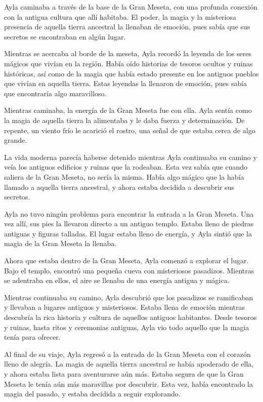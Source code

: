 
Ayla caminaba a través de la base de la Gran Meseta, con una profunda conexión con la antigua cultura que allí habitaba. El poder, la magia y la misteriosa presencia de aquella tierra ancestral la llenaban de emoción, pues sabía que sus secretos se encontraban en algún lugar.

Mientras se acercaba al borde de la meseta, Ayla recordó la leyenda de los seres mágicos que vivían en la región. Había oído historias de tesoros ocultos y ruinas históricas, así como de la magia que había estado presente en los antiguos pueblos que vivían en aquella tierra. Estas leyendas la llenaron de emoción, pues sabía que encontraría algo maravilloso.

Mientras caminaba, la energía de la Gran Meseta fue con ella. Ayla sentía como la magia de aquella tierra la alimentaba y le daba fuerza y determinación. De repente, un viento frío le acarició el rostro, una señal de que estaba cerca de algo grande.

La vida moderna parecía haberse detenido mientras Ayla continuaba su camino y veía los antiguos edificios y ruinas que la rodeaban. Esta vez sabía que cuando saliera de la Gran Meseta, no sería la misma. Había algo mágico que la había llamado a aquella tierra ancestral, y ahora estaba decidida a descubrir sus secretos.

Ayla no tuvo ningún problema para encontrar la entrada a la Gran Meseta. Una vez allí, sus pies la llevaron directo a un antiguo templo. Estaba lleno de piedras antiguas y figuras talladas. El lugar estaba lleno de energía, y Ayla sintió que la magia de la Gran Meseta la llenaba.

Ahora que estaba dentro de la Gran Meseta, Ayla comenzó a explorar el lugar. Bajo el templo, encontró una pequeña cueva con misteriosos pasadizos. Mientras se adentraba en ellos, el aire se llenaba de una energía antigua y mágica.

Mientras continuaba su camino, Ayla descubrió que los pasadizos se ramificaban y llevaban a lugares antiguos y misteriosos. Estaba llena de emoción mientras descubría la rica historia y cultura de aquellos antiguos habitantes. Desde tesoros y ruinas, hasta ritos y ceremonias antiguas, Ayla vio todo aquello que la magia tenía para ofrecer.

Al final de su viaje, Ayla regresó a la entrada de la Gran Meseta con el corazón lleno de alegría. La magia de aquella tierra ancestral se había apoderado de ella, y ahora estaba lista para aventurarse aún más. Estaba segura de que la Gran Meseta le tenía aún más maravillas por descubrir. Esta vez, había encontrado la magia del pasado, y estaba decidida a seguir explorando.